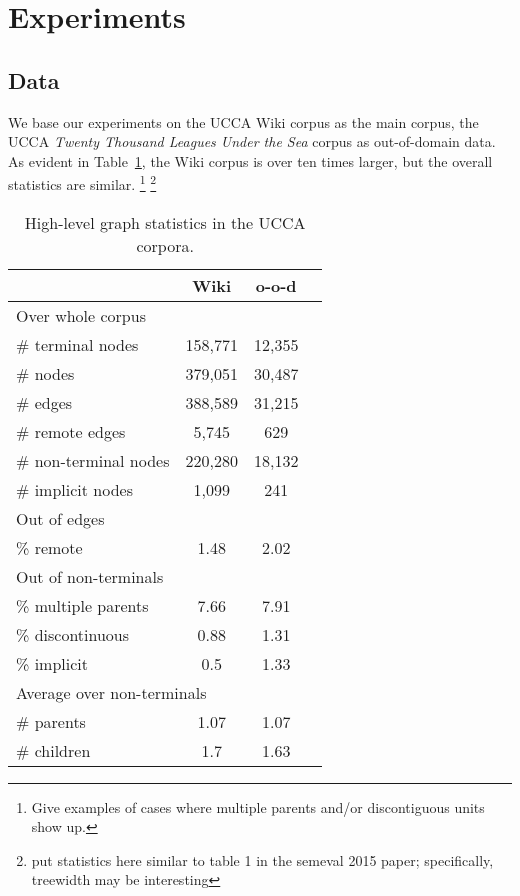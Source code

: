 \documentclass[11pt]{article}
\newcommand{\oa}[1]{\footnote{\color{red} #1}}
\newcommand{\tabref}[1]{Table~\ref{#1}}
\begin{document}
\section{Experiments}
\subsection{Data}\label{sec:data}

We base our experiments on the UCCA Wiki corpus as the main corpus, the UCCA \textit{Twenty Thousand Leagues Under the Sea} corpus as out-of-domain data. As evident in \tabref{table:data}, the Wiki corpus is over ten times larger, but the overall statistics are similar.
\oa{Give examples of cases where multiple parents and/or discontiguous units show up.}
\oa{put statistics here similar to table 1 in the semeval 2015 paper; specifically, treewidth may be interesting}

\begin{table}
\begin{tabular}{l|ccc}
& Wiki & o-o-d \\
\hline
\multicolumn{3}{l}{\footnotesize Over whole corpus} \\
\# terminal nodes & 158,771 & 12,355 \\
\# nodes & 379,051 & 30,487 \\
\# edges & 388,589 & 31,215 \\
\# remote edges & 5,745 & 629 \\
\# non-terminal nodes & 220,280 & 18,132 \\
\# implicit nodes & 1,099 & 241 \\
\multicolumn{3}{l}{\footnotesize Out of edges} \\
\% remote & 1.48 & 2.02 \\
\multicolumn{3}{l}{\footnotesize Out of non-terminals} \\
\% multiple parents & 7.66 & 7.91 \\
\% discontinuous & 0.88 & 1.31 \\
\% implicit & 0.5 & 1.33 \\
\multicolumn{3}{l}{\footnotesize Average over non-terminals} \\
\# parents & 1.07 & 1.07 \\
\# children & 1.7 & 1.63 \\
\end{tabular}
\caption{High-level graph statistics in the UCCA corpora.}
\label{table:data}
\end{table}
\end{document}
